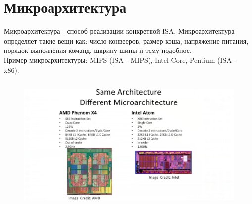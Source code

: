 \documentclass[12pt, a4paper]{article}
\begin{document}
\section{Микроархитектура}
Микроархитектура - способ реализации конкретной ISA. Микроархитектура определяет такие вещи как: число конвееров, размер кэша, напряжение питания, порядок выполнения команд, ширину шины и тому подобное.\\
Пример микроархитектуры: MIPS (ISA - MIPS), Intel Core, Pentium (ISA - x86).
\begin{figure}[h]
    \centering
    \includegraphics[width=0.8\linewidth]{./images/micro.png}
    \caption{}
    \label{fig:my_label}
\end{figure}
\end{document}
